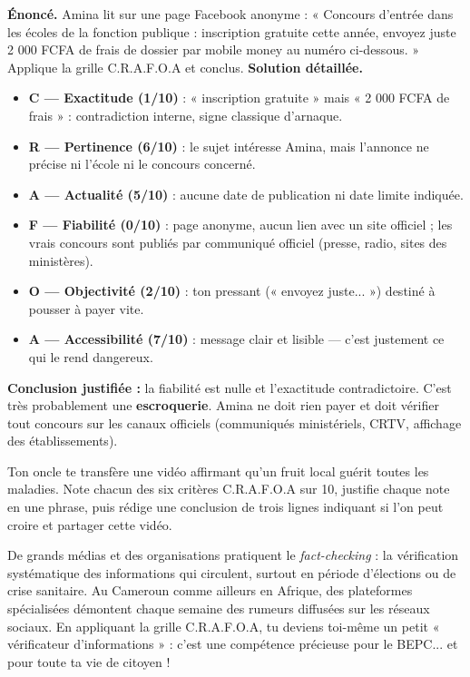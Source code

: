 \documentclass[11pt]{article}
\begin{document}
\begin{exoresolu}
\textbf{Énoncé.} Amina lit sur une page Facebook anonyme : « Concours d'entrée dans les écoles de la fonction publique : inscription gratuite cette année, envoyez juste 2 000 FCFA de frais de dossier par mobile money au numéro ci-dessous. » Applique la grille C.R.A.F.O.A et conclus.
\tcblower
\textbf{Solution détaillée.}
\begin{itemize}
\item \textbf{C — Exactitude (1/10)} : « inscription gratuite » mais « 2 000 FCFA de frais » : contradiction interne, signe classique d'arnaque.
\item \textbf{R — Pertinence (6/10)} : le sujet intéresse Amina, mais l'annonce ne précise ni l'école ni le concours concerné.
\item \textbf{A — Actualité (5/10)} : aucune date de publication ni date limite indiquée.
\item \textbf{F — Fiabilité (0/10)} : page anonyme, aucun lien avec un site officiel ; les vrais concours sont publiés par communiqué officiel (presse, radio, sites des ministères).
\item \textbf{O — Objectivité (2/10)} : ton pressant (« envoyez juste... ») destiné à pousser à payer vite.
\item \textbf{A — Accessibilité (7/10)} : message clair et lisible — c'est justement ce qui le rend dangereux.
\end{itemize}
\textbf{Conclusion justifiée :} la fiabilité est nulle et l'exactitude contradictoire. C'est très probablement une \textbf{escroquerie}. Amina ne doit rien payer et doit vérifier tout concours sur les canaux officiels (communiqués ministériels, CRTV, affichage des établissements).
\end{exoresolu}

\begin{exercice}
Ton oncle te transfère une vidéo affirmant qu'un fruit local guérit toutes les maladies. Note chacun des six critères C.R.A.F.O.A sur 10, justifie chaque note en une phrase, puis rédige une conclusion de trois lignes indiquant si l'on peut croire et partager cette vidéo.
\end{exercice}

\begin{savaistu}
De grands médias et des organisations pratiquent le \emph{fact-checking} : la vérification systématique des informations qui circulent, surtout en période d'élections ou de crise sanitaire. Au Cameroun comme ailleurs en Afrique, des plateformes spécialisées démontent chaque semaine des rumeurs diffusées sur les réseaux sociaux. En appliquant la grille C.R.A.F.O.A, tu deviens toi-même un petit « vérificateur d'informations » : c'est une compétence précieuse pour le BEPC... et pour toute ta vie de citoyen !
\end{savaistu}
\end{document}
